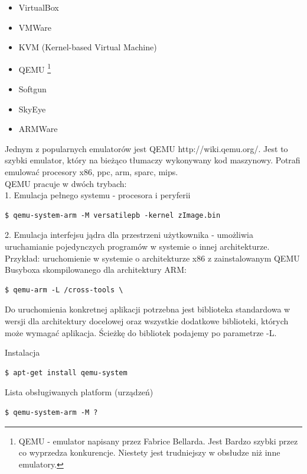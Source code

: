 \begin{itemize}
	\item VirtualBox
	\item VMWare
	\item KVM (Kernel-based Virtual Machine) 
	\item QEMU  \footnote {QEMU - emulator napisany przez Fabrice Bellarda. Jest Bardzo szybki przez co wyprzedza konkurencje. Niestety jest trudniejszy w obsłudze niż inne emulatory.}
	\item Softgun
	\item SkyEye
	\item ARMWare  
\end{itemize}

Jednym z popularnych emulatorów jest QEMU 
http://wiki.qemu.org/. Jest to szybki emulator, który na bieżąco tłumaczy wykonywany kod maszynowy. Potrafi emulować procesory x86, ppc, arm, sparc, mips.
\\
\newpage
QEMU pracuje w dwóch trybach:
\\

1. Emulacja pełnego systemu - procesora i peryferii

\begin{lstlisting}
$ qemu-system-arm -M versatilepb -kernel zImage.bin
\end{lstlisting}


2. Emulacja interfejsu jądra dla przestrzeni użytkownika - umożliwia uruchamianie pojedynczych programów w systemie o innej architekturze.
Przykład: uruchomienie w systemie o architekturze x86 z zainstalowanym QEMU Busyboxa skompilowanego dla architektury ARM:

\begin{lstlisting}
$ qemu-arm -L /cross-tools \
\end{lstlisting}

Do uruchomienia konkretnej aplikacji potrzebna jest biblioteka standardowa w wersji dla architektury docelowej oraz wszystkie dodatkowe biblioteki, których może wymagać aplikacja. Ścieżkę do bibliotek podajemy po parametrze -L.

Instalacja 	

\begin{lstlisting}
$ apt-get install qemu-system
\end{lstlisting}

Lista obsługiwanych platform (urządzeń)

\begin{lstlisting}
$ qemu-system-arm -M ?
\end{lstlisting}

